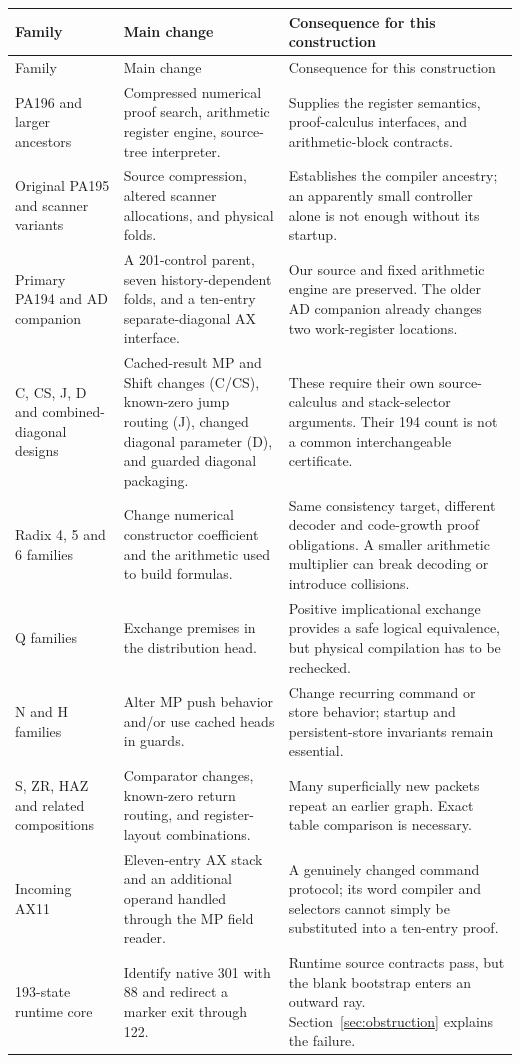 \documentclass[11pt]{article}
\begin{document}
\begin{longtable}{@{}p{}p{}p{}@{}}
\toprule Family & Main change & Consequence for this construction\\\midrule
\endfirsthead
\toprule Family & Main change & Consequence for this construction\\\midrule
\endhead
PA196 and larger ancestors & Compressed numerical proof search, arithmetic register engine, source-tree interpreter. & Supplies the register semantics, proof-calculus interfaces, and arithmetic-block contracts.\\
Original PA195 and scanner variants & Source compression, altered scanner allocations, and physical folds. & Establishes the compiler ancestry; an apparently small controller alone is not enough without its startup.\\
Primary PA194 and AD companion & A 201-control parent, seven history-dependent folds, and a ten-entry separate-diagonal AX interface. & Our source and fixed arithmetic engine are preserved. The older AD companion already changes two work-register locations.\\
C, CS, J, D and combined-diagonal designs & Cached-result MP and Shift changes (C/CS), known-zero jump routing (J), changed diagonal parameter (D), and guarded diagonal packaging. & These require their own source-calculus and stack-selector arguments. Their 194 count is not a common interchangeable certificate.\\
Radix 4, 5 and 6 families & Change numerical constructor coefficient and the arithmetic used to build formulas. & Same consistency target, different decoder and code-growth proof obligations. A smaller arithmetic multiplier can break decoding or introduce collisions.\\
Q families & Exchange premises in the distribution head. & Positive implicational exchange provides a safe logical equivalence, but physical compilation has to be rechecked.\\
N and H families & Alter MP push behavior and/or use cached heads in guards. & Change recurring command or store behavior; startup and persistent-store invariants remain essential.\\
S, ZR, HAZ and related compositions & Comparator changes, known-zero return routing, and register-layout combinations. & Many superficially new packets repeat an earlier graph. Exact table comparison is necessary.\\
Incoming AX11 & Eleven-entry AX stack and an additional operand handled through the MP field reader. & A genuinely changed command protocol; its word compiler and selectors cannot simply be substituted into a ten-entry proof.\\
193-state runtime core & Identify native 301 with 88 and redirect a marker exit through 122. & Runtime source contracts pass, but the blank bootstrap enters an outward ray. Section~\ref{sec:obstruction} explains the failure.\\
\bottomrule
\end{longtable}
\end{document}

